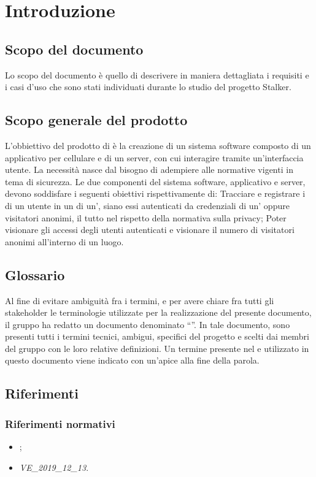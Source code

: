 \section{Introduzione}
\subsection{Scopo del documento}
Lo scopo del documento è quello di descrivere in maniera dettagliata i requisiti e i casi d'uso che sono stati individuati durante lo studio del progetto Stalker.

\subsection{Scopo generale del prodotto}
L'obbiettivo del prodotto \NomeProgetto{} di \Proponente{} è la creazione di un sistema software composto di un applicativo per cellulare e di un server, con cui interagire tramite un'interfaccia utente. La necessità nasce dal bisogno di adempiere alle normative vigenti in tema di sicurezza.
Le due componenti del sistema software, applicativo e server, devono soddisfare i seguenti obiettivi rispettivamente di:
Tracciare e registrare i  di un utente in un  di un', siano essi autenticati da credenziali di un' oppure visitatori anonimi, il tutto nel rispetto della normativa sulla privacy;
Poter visionare gli accessi degli utenti autenticati e visionare il numero di visitatori anonimi all'interno di un luogo.

\subsection{Glossario}
Al fine di evitare ambiguità fra i termini, e per avere chiare fra tutti gli stakeholder le terminologie utilizzate per la realizzazione del presente documento, il gruppo \Gruppo{} ha redatto un documento denominato “”.
In tale documento, sono presenti tutti i termini tecnici, ambigui, specifici del progetto e scelti dai membri del gruppo con le loro relative definizioni.
Un termine presente nel  e utilizzato in questo documento viene indicato con un'apice  alla fine della parola.

\subsection{Riferimenti}

\subsubsection{Riferimenti normativi}
\begin{itemize}
\item {};
\item \textit{VE\_2019\_12\_13}.
\end{itemize}


